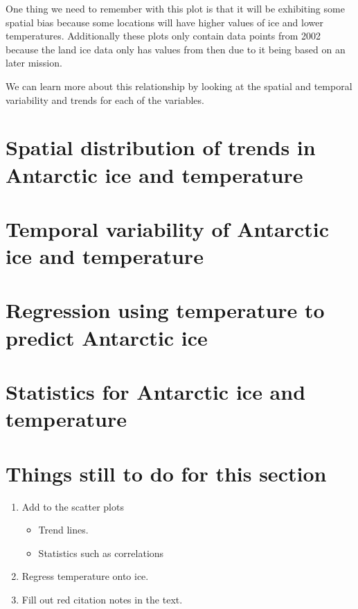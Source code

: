 \documentclass[../main.tex]{subfiles}
\begin{document}
One thing we need to remember with this plot is that it will be exhibiting some spatial bias because some locations will have higher values of ice and lower temperatures. Additionally these plots only contain data points from 2002 because the land ice data only has values from then due to it being based on an later mission. 

We can learn more about this relationship by looking at the spatial and temporal variability and trends for each of the variables.

\section[Spatial distribution of trends]{Spatial distribution of trends in Antarctic ice and temperature}


\section{Temporal variability of Antarctic ice and temperature}

\section{Regression using temperature to predict Antarctic ice}

\section{Statistics for Antarctic ice and temperature}

\section*{Things still to do for this section}
\begin{enumerate}
    \item Add to the scatter plots
    \begin{itemize}
        \item Trend lines.
        \item Statistics such as correlations
    \end{itemize}
    \item Regress temperature onto ice.
    \item Fill out red citation notes in the text.
\end{enumerate}
\end{document}
